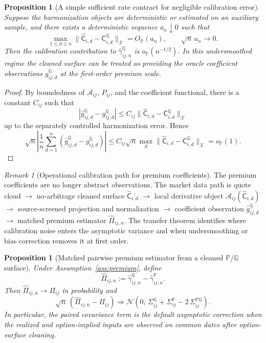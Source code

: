 \documentclass[11pt,a4paper]{amsart}
\theoremstyle{plain}
\newtheorem{proposition}[theorem]{Proposition}
\theoremstyle{definition}
\theoremstyle{remark}
\newtheorem{remark}[theorem]{Remark}
\newcommand{\PP}{\mathbb{P}}
\newcommand{\QQ}{\mathbb{Q}}
\newcommand{\cA}{\mathcal{A}}
\newcommand{\cX}{\mathcal{X}}
\begin{document}
\begin{proposition}[A simple sufficient rate contract for negligible calibration error]\label{prop:surface-rate-contract}
Suppose the harmonization objects are deterministic or estimated on an auxiliary sample, and
there exists a deterministic sequence \(a_n\downarrow0\) such that
\[
        \max_{1\le d\le n}\|\widehat{\mathsf C}_{i,d}-\mathsf C_{i,d}^{\QQ}\|_{\cX}=O_\PP(a_n),
        \qquad
        \sqrt n\,a_n\to0.
\]
Then the calibration contribution to
\(\widehat\gamma_{ij,n}^{\QQ}\) is \(o_\PP(n^{-1/2})\).  In this undersmoothed regime the cleaned
surface can be treated as providing the oracle coefficient observations
\(g_{ij,d}^{\QQ}\) at the first-order premium scale.
\end{proposition}

\begin{proof}
By boundedness of \(\cA_{ij}\), \(P_{ij}\), and the coefficient functional, there is a constant
\(C_{ij}\) such that
\[
        |\widehat g_{ij,d}^{\QQ}-g_{ij,d}^{\QQ}|
        \le
        C_{ij}\|\widehat{\mathsf C}_{i,d}-\mathsf C_{i,d}^{\QQ}\|_{\cX}
\]
up to the separately controlled harmonization error.  Hence
\[
        \sqrt n\left|
        \frac1n\sum_{d=1}^n(\widehat g_{ij,d}^{\QQ}-g_{ij,d}^{\QQ})
        \right|
        \le
        C_{ij}\sqrt n\max_d\|\widehat{\mathsf C}_{i,d}-\mathsf C_{i,d}^{\QQ}\|_{\cX}
        =o_\PP(1).
\]
\end{proof}

\begin{remark}[Operational calibration path for premium coefficients]\label{rem:premium-calibration-path}
The premium coefficients are no longer abstract observations.  The market data path is
quote cloud \(\to\) no-arbitrage cleaned surface \(\widehat{\mathsf C}_{i,d}\) \(\to\) local derivative
object \(\cA_{ij}(\widehat{\mathsf C}_{i,d})\) \(\to\) source-screened projection and normalization
\(\to\) coefficient observation \(\widehat g_{ij,d}^{\QQ}\) \(\to\) matched premium estimator
\(\widehat\Pi_{ij,n}\).  The transfer theorem identifies where calibration noise enters the
asymptotic variance and when undersmoothing or bias correction removes it at first order.
\end{remark}

\begin{proposition}[Matched pairwise premium estimator from a cleaned \texorpdfstring{\(\PP/\QQ\)}{P/Q} surface]\label{thm:premium-estimator}
Under Assumption~\ref{ass:premium}, define
\[
        \widehat\Pi_{ij,n}:=\widehat\gamma_{ij,n}^\QQ-\widehat\gamma_{ij,n}^\PP.
\]
Then \(\widehat\Pi_{ij,n}\to\Pi_{ij}\) in probability and
\[
        \sqrt{n}\,(\widehat\Pi_{ij,n}-\Pi_{ij})
        \Rightarrow
        \mathcal N\!\left(
                0,\,
                \Sigma_{ij}^\QQ
                +
                \Sigma_{ij}^\PP
                -
                2\,\Sigma_{ij}^{\PP\QQ}
        \right).
\]
In particular, the paired covariance term is the default asymptotic correction when the realized
and option-implied inputs are observed on common dates after option-surface cleaning.
\end{proposition}
\end{document}
